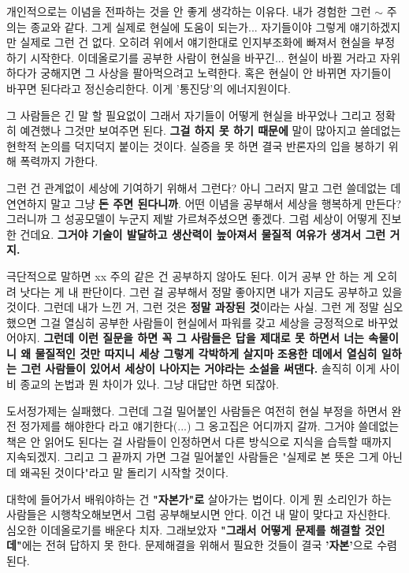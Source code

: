 개인적으로는 이념을 전파하는 것을 안 좋게 생각하는 이유다.
내가 경험한 그런 $\sim$ 주의는 종교와 같다. 그게 실제로 현실에 도움이 되는가... 자기들이야 그렇게 얘기하겠지만 실제로 그런 건 없다.
오히려 위에서 얘기한대로 인지부조화에 빠져서 현실을 부정하기 시작한다.
이데올로기를 공부한 사람이 현실을 바꾸긴... 현실이 바뀔 거라고 자위하다가 궁해지면 그 사상을 팔아먹으려고 노력한다.
혹은 현실이 안 바뀌면 자기들이 바꾸면 된다라고 정신승리한다. 이게 '통진당'의 에너지원이다.
\vspace{5mm}

그 사람들은 긴 말 할 필요없이 그래서 자기들이 어떻게 현실을 바꾸었나 그리고 정확히 예견했나 그것만 보여주면 된다.
\textbf{그걸 하지 못 하기 때문에} 말이 많아지고 쓸데없는 현학적 논의를 덕지덕지 붙이는  것이다.
실증을 못 하면 결국 반론자의 입을 봉하기 위해 폭력까지 가한다.
\vspace{5mm}

그런 건 관계없이 세상에 기여하기 위해서 그런다?
아니 그러지 말고 그런 쓸데없는 데 연연하지 말고 그냥 \textbf{돈 주면 된다니까}.
어떤 이념을 공부해서 세상을 행복하게 만든다? 그러니까 그 성공모델이 누군지 제발 가르쳐주셨으면 좋겠다.
그럼 세상이 어떻게 진보한 건데요. \textbf{그거야 기술이 발달하고 생산력이 높아져서 물질적 여유가 생겨서 그런 거지.}
\vspace{5mm}

극단적으로 말하면 xx 주의 같은 건 공부하지 않아도 된다. 이거 공부 안 하는 게 오히려 낫다는 게 내 판단이다.
그런 걸 공부해서 정말 좋아지면 내가 지금도 공부하고 있을 것이다. 그런데 내가 느낀 거, 그런 것은 \textbf{정말 과장된 것}이라는 사실.
그런 게 정말 심오했으면 그걸 열심히 공부한 사람들이 현실에서 파워를 갖고 세상을 긍정적으로 바꾸었어야지.
\textbf{그런데 이런 질문을 하면 꼭 그 사람들은 답을 제대로 못 하면서 너는 속물이니 왜 물질적인 것만 따지니 세상 그렇게 각박하게 살지마}
\textbf{조용한 데에서 열심히 일하는 그런 사람들이 있어서 세상이 나아지는 거야라는 소설을 써댄다.}
솔직히 이게 사이비 종교의 논법과 뭔 차이가 있나.
그냥 대답만 하면 되잖아.
\vspace{5mm}

도서정가제는 실패했다. 그런데 그걸 밀어붙인 사람들은 여전히 현실 부정을 하면서 완전 정가제를 해야한다 라고 얘기한다(...)
그 옹고집은 어디까지 갈까. 그거야 쓸데없는 책은 안 읽어도 된다는 걸 사람들이 인정하면서 다른 방식으로 지식을 습득할 때까지 지속되겠지.
그리고 그 끝까지 가면 그걸 밀어붙인 사람들은 "실제로 본 뜻은 그게 아닌데 왜곡된 것이다"라고 말 돌리기 시작할 것이다.
\vspace{5mm}

대학에 들어가서 배워야하는 건 \textbf{"자본가"로} 살아가는 법이다.
이게 뭔 소리인가 하는 사람들은 시행착오해보면서 그럼 공부해보시면 안다. 이건 내 말이 맞다고 자신한다.
심오한 이데올로기를 배운다 치자. 그래보았자 \textbf{"그래서 어떻게 문제를 해결할 것인데"}에는 전혀 답하지 못 한다.
문제해결을 위해서 필요한 것들이 결국 \textbf{'자본'}으로 수렴된다.
\vspace{5mm}

